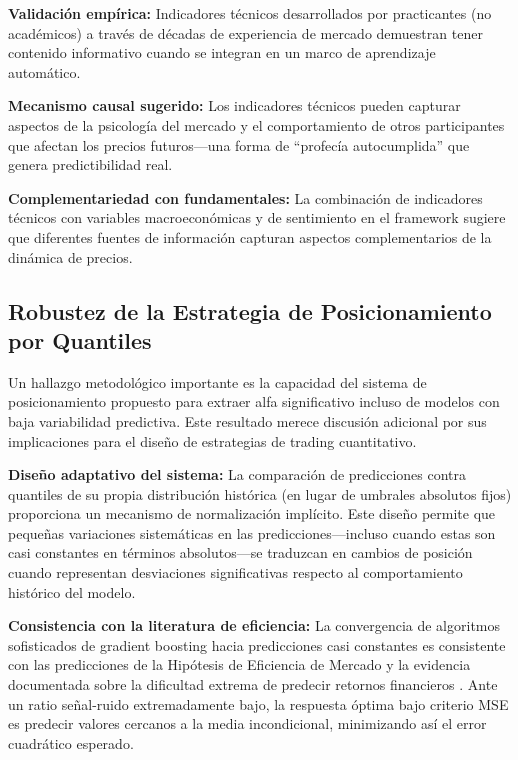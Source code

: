 \documentclass[11pt,a4paper]{article}
\begin{document}
\textbf{Validación empírica:} Indicadores técnicos desarrollados por practicantes (no académicos) a través de décadas de experiencia de mercado demuestran tener contenido informativo cuando se integran en un marco de aprendizaje automático.

\textbf{Mecanismo causal sugerido:} Los indicadores técnicos pueden capturar aspectos de la psicología del mercado y el comportamiento de otros participantes que afectan los precios futuros---una forma de ``profecía autocumplida'' que genera predictibilidad real.

\textbf{Complementariedad con fundamentales:} La combinación de indicadores técnicos con variables macroeconómicas y de sentimiento en el framework sugiere que diferentes fuentes de información capturan aspectos complementarios de la dinámica de precios.

\subsection{Robustez de la Estrategia de Posicionamiento por Quantiles}

Un hallazgo metodológico importante es la capacidad del sistema de posicionamiento propuesto para extraer alfa significativo incluso de modelos con baja variabilidad predictiva. Este resultado merece discusión adicional por sus implicaciones para el diseño de estrategias de trading cuantitativo.

\textbf{Diseño adaptativo del sistema:} La comparación de predicciones contra quantiles de su propia distribución histórica (en lugar de umbrales absolutos fijos) proporciona un mecanismo de normalización implícito. Este diseño permite que pequeñas variaciones sistemáticas en las predicciones---incluso cuando estas son casi constantes en términos absolutos---se traduzcan en cambios de posición cuando representan desviaciones significativas respecto al comportamiento histórico del modelo.

\textbf{Consistencia con la literatura de eficiencia:} La convergencia de algoritmos sofisticados de gradient boosting hacia predicciones casi constantes es consistente con las predicciones de la Hipótesis de Eficiencia de Mercado \citep{fama1970} y la evidencia documentada sobre la dificultad extrema de predecir retornos financieros \citep{gu2020}. Ante un ratio señal-ruido extremadamente bajo, la respuesta óptima bajo criterio MSE es predecir valores cercanos a la media incondicional, minimizando así el error cuadrático esperado.
\end{document}
